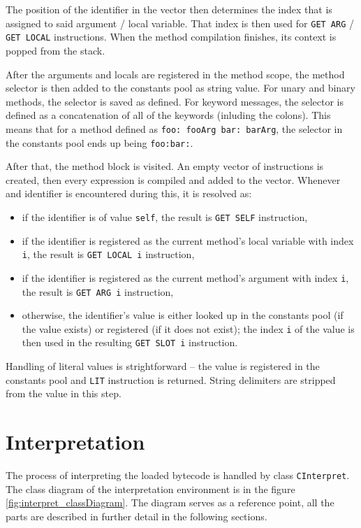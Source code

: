 \documentclass[thesis=M,english]{FITthesis}[2019/12/23]
\begin{document}
The position of the identifier in the vector then determines the index that is assigned to said argument / local variable. That index is then used for
\texttt{GET ARG} / \texttt{GET LOCAL} instructions. When the method compilation finishes, its context is popped from the stack.

After the arguments and locals are registered in the method scope, the method selector is then added to the constants pool as string value. For unary and binary
methods, the selector is saved as defined. For keyword messages, the selector is defined as a concatenation of all of the keywords (inluding the colons). This means
that for a method defined as \texttt{foo: fooArg bar: barArg}, the selector in the constants pool ends up being \texttt{foo:bar:}.

After that, the method block is visited. An empty vector of instructions is created, then every expression is compiled and added to the vector. Whenever and identifier
is encountered during this, it is resolved as:
\begin{itemize}
	\item if the identifier is of value \texttt{self}, the result is \texttt{GET SELF} instruction,
	\item if the identifier is registered as the current method's local variable with index \texttt{i}, the result is \texttt{GET LOCAL i} instruction,
	\item if the identifier is registered as the current method's argument with index \texttt{i}, the result is \texttt{GET ARG i} instruction,
	\item otherwise, the identifier's value is either looked up in the constants pool (if the value exists) or registered (if it does not exist);
		the index \texttt{i} of the value is then used in the resulting \texttt{GET SLOT i} instruction.
\end{itemize}

Handling of literal values is strightforward -- the value is registered in the constants pool and \texttt{LIT} instruction is returned. String delimiters are stripped
from the value in this step.

\section{Interpretation}
The process of interpreting the loaded bytecode is handled by class \texttt{CInterpret}. The class diagram of the interpretation environment is
in the figure \ref{fig:interpret_classDiagram}. The diagram serves as a reference point, all the parts are described in further detail in the
following sections.
\end{document}
